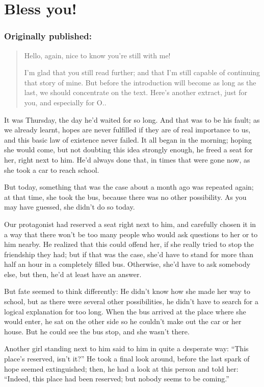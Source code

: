 \chapter{Bless you!}
\label{cha:bless-you}
\subsection*{Originally published: }
\begin{quote}
Hello, again, nice to know you're still with me!

I'm glad that you still read further; and that I'm still capable of continuing that story of mine. But before the introduction will become as long as the last, we should concentrate on the text. Here's another extract, just for you, and especially for O..
\end{quote}

It was Thursday, the day he'd waited for so long. 
And that was to be his fault; as we already learnt, hopes are never fulfilled if they are of real importance to us, and this basic law of existence never failed.
It all began in the morning; hoping she would come, but not doubting this idea strongly enough, he freed a seat for her, right next to him.
He'd always done that, in times that were gone now, as she took a car to reach school.

But today, something that was the case about a month ago was repeated again; at that time, she took the bus, because there was no other possibility. 
As you may have guessed, she didn't do so today.

Our protagonist had reserved a seat right next to him, and carefully chosen it in a way that there won't be too many people who would ask questions to her or to him nearby. He realized that this could offend her, if she really tried to stop the friendship they had; but if that was the case, she'd have to stand for more than half an hour in a completely filled bus. 
Otherwise, she'd have to ask somebody else, but then, he'd at least have an answer.

But fate seemed to think differently: He didn't know how she made her way to school, but as there were several other possibilities, he didn't have to search for a logical explanation for too long. 
When the bus arrived at the place where she would enter, he sat on the other side so he couldn't make out the car or her house. 
But he could see the bus stop, and she wasn't there.

Another girl standing next to him said to him in quite a desperate way: \enquote{This place's reserved, isn't it?} He took a final look around, before the last spark of hope seemed extinguished; then, he had a look at this person and told her: \enquote{Indeed, this place had been reserved; but nobody seems to be coming.}

